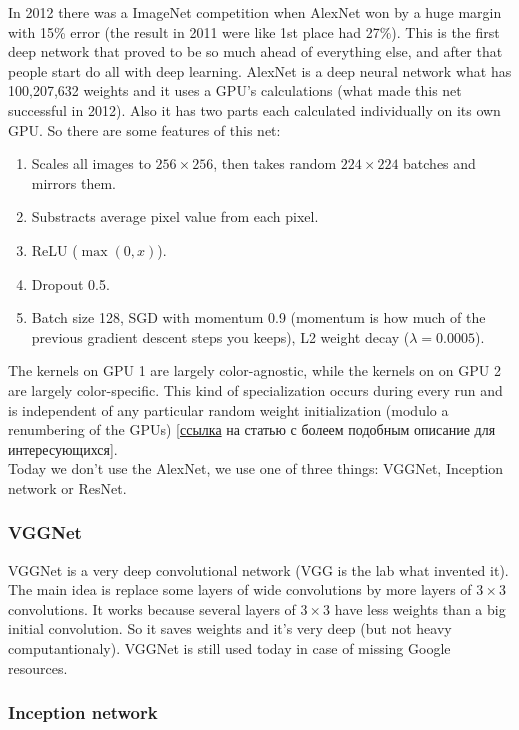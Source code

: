 In 2012 there was a ImageNet competition when AlexNet won by a huge margin with 15\% error (the result in 2011 were like 1st place had 27\%). This is the first deep network that proved to be so much ahead of everything else, and after that people start do all with deep learning.
AlexNet is a deep neural network what has 100,207,632 weights and it uses a GPU's calculations (what made this net successful in 2012). Also it has two parts each calculated individually on its own GPU. So there are some features of this net:\\
\begin{enumerate}[label=$\bullet$]
  \item Scales all images to $256\times256$, then takes random $224\times224$ batches and mirrors them.
  \item Substracts average pixel value from each pixel.
  \item ReLU ($\max(0,x)$).
  \item Dropout 0.5.
  \item Batch size 128, SGD with momentum 0.9 (momentum is how much of the previous gradient descent steps you keeps), L2 weight decay ($\lambda=0.0005$).
\end{enumerate}
The kernels on GPU 1 are largely color-agnostic, while the kernels on on GPU 2 are largely color-specific. This kind of specialization occurs during every run and is independent of any particular random weight initialization (modulo a renumbering of the GPUs) [\href{https://www.nvidia.cn/content/tesla/pdf/machine-learning/imagenet-classification-with-deep-convolutional-nn.pdf}{ссылка} на статью с болеем подобным описание для интересующихся].\\
Today we don't use the AlexNet, we use one of three things: VGGNet, Inception network or ResNet.

\subsubsection*{VGGNet}

VGGNet is a very deep convolutional network (VGG is the lab what invented it). The main idea is replace some layers of wide convolutions by more layers of $3\times3$ convolutions. It works because several layers of $3\times3$ have less weights than a big initial convolution. So it saves weights and it's very deep (but not heavy computantionaly). VGGNet is still used today in case of missing Google resources.

\subsubsection*{Inception network}

